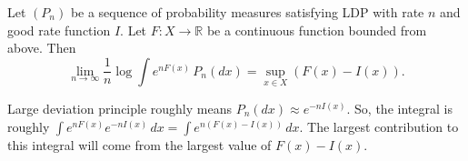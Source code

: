 
\begin{theorem}
    \label{thm:varadhan}
    Let $(P_n)$ be a sequence of probability measures satisfying LDP with rate $n$ and good rate function $I$. Let $F: X \to \mathbb{R}$ be a continuous function bounded from above. Then
    \[
        \lim_{n \to \infty} \frac{1}{n} \log \int e^{nF(x)} \, P_n(dx) = \sup_{x \in X} \left( F(x) - I(x) \right)      
    .\] 
\end{theorem}

\begin{intuition}
    Large deviation principle roughly means $P_n(dx) \approx e^{-nI(x)}$. So, the integral is roughly $\int e^{nF(x)} e^{-nI(x)} \, dx = \int e^{n(F(x) - I(x))} \, dx$. The largest contribution to this integral will come from the largest value of $F(x) - I(x)$.
\end{intuition}

